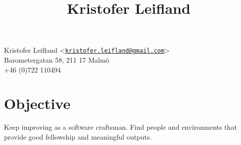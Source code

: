 \documentclass[10pt]{article}
\title{Kristofer Leifland}
\author{}
\date{}
\begin{document}
\maketitle
\thispagestyle{empty}
\pagestyle{empty}
\noindent



\noindent
Kristofer Leifland <\href{mailto:kristofer.leifland@gmail.com}{\nolinkurl{kristofer.leifland@gmail.com}}>\\
Barometergatan 58, 211 17 Malmö\\
+46 (0)722 110494\\


\section*{Objective}
Keep improving as a software craftsman. Find people and environments that provide good fellowship and meaningful outputs.
\end{document}
